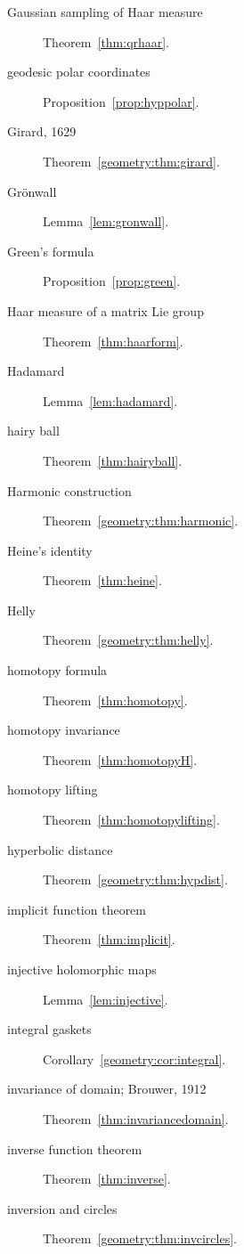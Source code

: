 \begin{description}
\item[Gaussian sampling of Haar measure] Theorem~\ref{thm:qrhaar}.
\item[geodesic polar coordinates] Proposition~\ref{prop:hyppolar}.
\item[Girard, 1629] Theorem~\ref{geometry:thm:girard}.
\item[Gr\"onwall] Lemma~\ref{lem:gronwall}.
\item[Green's formula] Proposition~\ref{prop:green}.
\item[Haar measure of a matrix Lie group] Theorem~\ref{thm:haarform}.
\item[Hadamard] Lemma~\ref{lem:hadamard}.
\item[hairy ball] Theorem~\ref{thm:hairyball}.
\item[Harmonic construction] Theorem~\ref{geometry:thm:harmonic}.
\item[Heine's identity] Theorem~\ref{thm:heine}.
\item[Helly] Theorem~\ref{geometry:thm:helly}.
\item[homotopy formula] Theorem~\ref{thm:homotopy}.
\item[homotopy invariance] Theorem~\ref{thm:homotopyH}.
\item[homotopy lifting] Theorem~\ref{thm:homotopylifting}.
\item[hyperbolic distance] Theorem~\ref{geometry:thm:hypdist}.
\item[implicit function theorem] Theorem~\ref{thm:implicit}.
\item[injective holomorphic maps] Lemma~\ref{lem:injective}.
\item[integral gaskets] Corollary~\ref{geometry:cor:integral}.
\item[invariance of domain; Brouwer, 1912] Theorem~\ref{thm:invariancedomain}.
\item[inverse function theorem] Theorem~\ref{thm:inverse}.
\item[inversion and circles] Theorem~\ref{geometry:thm:invcircles}.

\end{description}
